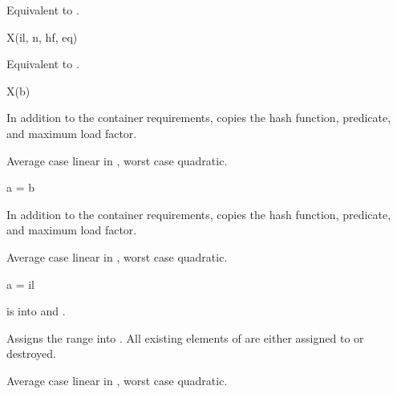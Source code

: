 \begin{itemdescr}
\pnum
\effects
Equivalent to .
\end{itemdescr}

\begin{itemdecl}
X(il, n, hf, eq)
\end{itemdecl}

\begin{itemdescr}
\pnum
\effects
Equivalent to .
\end{itemdescr}

\begin{itemdecl}
X(b)
\end{itemdecl}

\begin{itemdescr}
\pnum
\effects
In addition to the container requirements,
copies the hash function, predicate, and maximum load factor.

\pnum
\complexity
Average case linear in , worst case quadratic.
\end{itemdescr}

\begin{itemdecl}
a = b
\end{itemdecl}

\begin{itemdescr}
\pnum
\result
{}

\pnum
\effects
In addition to the container requirements,
copies the hash function, predicate, and maximum load factor.

\pnum
\complexity
Average case linear in , worst case quadratic.
\end{itemdescr}

\begin{itemdecl}
a = il
\end{itemdecl}

\begin{itemdescr}
\pnum
\result
{}

\pnum
\expects
{} is  into 
and .

\pnum
\effects
Assigns the range  into .
All existing elements of  are either assigned to or destroyed.

\pnum
\complexity
Average case linear in , worst case quadratic.
\end{itemdescr}

